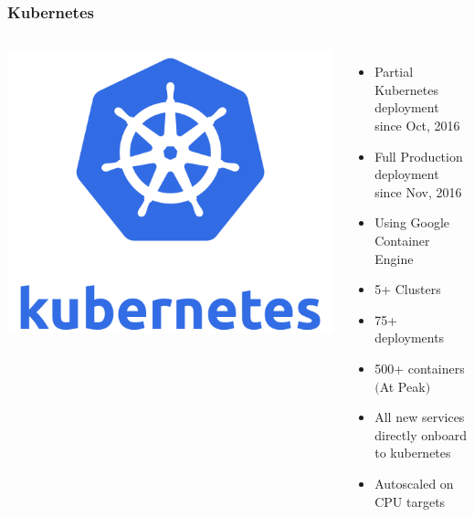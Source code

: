 \documentclass[12pt]{beamer}
\begin{document}
    \begin{frame}
        \frametitle{Kubernetes}
        \begin{columns}
            \begin{center}
                \includegraphics[width=1\textwidth]{images/k8s.png}
            \end{center}

            \begin{itemize}
                \item Partial Kubernetes deployment since Oct, 2016
                \item Full Production deployment since Nov, 2016
                \item Using Google Container Engine
                \pause
                \item 5+ Clusters
                \item 75+ deployments
                \item 500+ containers $($At Peak$)$
                \pause
                \item All new services directly onboard to kubernetes
                \item Autoscaled on CPU targets
            \end{itemize}
        \end{columns}
    \end{frame}
\end{document}
